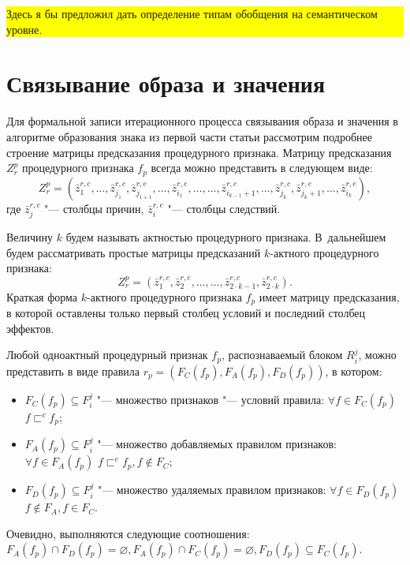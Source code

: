 \documentclass[a4paper, 12pt]{article}
\theoremstyle{plain}
\begin{document}
	\noindent\colorbox{yellow}{
		\parbox{\dimexpr\linewidth-2\fboxsep}{Здесь я бы предложил дать определение типам обобщения на семантическом уровне.}
	}
	
	\section{Связывание образа и значения}
		Для формальной записи итерационного процесса связывания образа и значения в алгоритме образования знака из первой части статьи рассмотрим подробнее строение матрицы предсказания процедурного признака. Матрицу предсказания $Z_r^p$ процедурного признака $f_p$ всегда можно представить в следующем виде:
		\begin{equation}
		Z_r^p=(\bar z_1^{r,c},\dots,\bar z_{j_1}^{r,c},\bar z_{j_{1+1}}^{r,e},\dots,\bar z_{i_1}^{r,e},\dots,\dots,\bar z_{i_{k-1}+1}^{r,c},\dots,\bar z_{j_k}^{r,c},\bar z_{j_k+1}^{r,e},\dots,\bar z_{i_k}^{r,e}),
		\end{equation}
		где $\bar z_j^{r,c}$ "--- столбцы причин, $\bar z_i^{r,e}$ "--- столбцы следствий. 
		
		Величину $k$ будем называть актностью процедурного признака. В~дальнейшем будем рассматривать простые матрицы предсказаний $k$-актного процедурного признака:
		\begin{equation}
		Z_r^p=(\bar z_1^{r,c},\bar z_2^{r,e},\dots,\dots,\bar z_{2\cdot k-1}^{r,c},\bar z_{2\cdot k}^{r,e}).
		\end{equation}
		Краткая форма $k$-актного процедурного признака $f_p$ имеет матрицу предсказания, в которой оставлены только первый столбец условий и последний столбец эффектов.
		
		Любой одноактный процедурный признак $f_p$, распознаваемый блоком $R_i^j$, можно представить в виде правила $r_p=(F_C(f_p),F_A(f_p),F_D(f_p))$, в котором:
		\begin{itemize}
			\item $F_C (f_p )\subseteq F_i^j$ "--- множество признаков "--- условий правила: $\forall f\in F_C(f_p)$ $f\sqsubset^c f_p$;
			\item $F_A(f_p)\subseteq F_i^j$ "--- множество добавляемых правилом признаков: $\forall f\in F_A(f_p)$ $f\sqsubset^e f_p,f\notin F_C$;
			\item $F_D(f_p)\subseteq F_i^j$ "--- множество удаляемых правилом признаков: $\forall f\in F_D(f_p)$ $f\notin F_A,f\in F_C$.
		\end{itemize}
		
		Очевидно, выполняются следующие соотношения: $F_A(f_p)\cap F_D(f_p)=\varnothing, F_A(f_p)\cap F_C(f_p)=\varnothing, F_D(f_p)\subseteq F_C(f_p)$.
		
\end{document}
